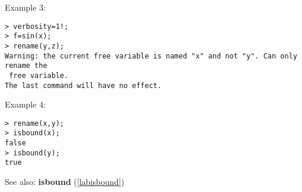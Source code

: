 \noindent Example 3: 
\begin{center}\begin{minipage}{15cm}\begin{Verbatim}[frame=single]
> verbosity=1!;
> f=sin(x);
> rename(y,z);
Warning: the current free variable is named "x" and not "y". Can only rename the
 free variable.
The last command will have no effect.
\end{Verbatim}
\end{minipage}\end{center}
\noindent Example 4: 
\begin{center}\begin{minipage}{15cm}\begin{Verbatim}[frame=single]
> rename(x,y);
> isbound(x);
false
> isbound(y);
true
\end{Verbatim}
\end{minipage}\end{center}
See also: \textbf{isbound} (\ref{labisbound})
